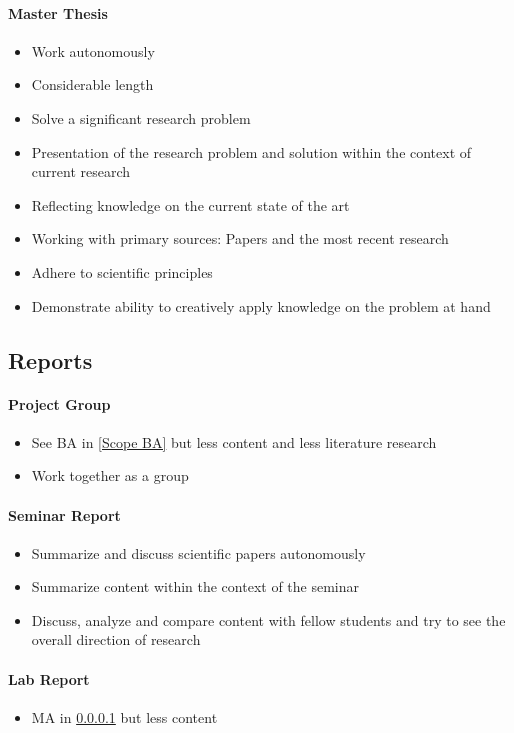 \documentclass[logo, twocolumn]{mlai-report}
\begin{document}
\paragraph{Master Thesis} \label{Scope MA}
\begin{itemize}
	\item Work autonomously
	\item Considerable length
	\item Solve a significant research problem
	\item Presentation of the research problem and solution within the context of current research
	\item Reflecting knowledge on the current state of the art
	\item Working with primary sources: Papers and the most recent research
	\item Adhere to scientific principles
	\item Demonstrate ability to creatively apply knowledge on the problem at hand
\end{itemize}

\subsection{Reports}

\paragraph{Project Group}
	\begin{itemize}
		\item See BA in \ref{Scope BA} but less content and less literature research
		\item Work together as a group
	\end{itemize}
\paragraph{Seminar Report}
	\begin{itemize}
		\item Summarize and discuss scientific papers autonomously
		\item Summarize content within the context of the seminar
		\item Discuss, analyze and compare content with fellow students and try to see the overall direction of research
	\end{itemize}
\paragraph{Lab Report}
	\begin{itemize}
		\item  MA in \ref{Scope MA} but less content
	\end{itemize}
\end{document}
